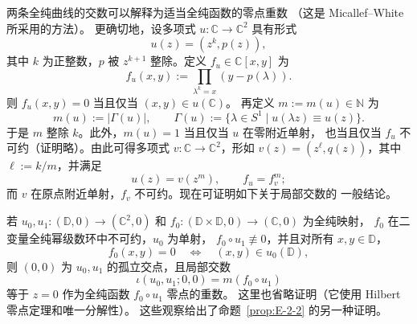 \begin{remark}\label{rem:E-2-6}
两条全纯曲线的交数可以解释为适当全纯函数的零点重数
（这是 Micallef--White~ 所采用的方法）。
更确切地，设多项式 $u:\mathbb C\to\mathbb C^2$ 具有形式
\[
  u(z)=(z^k,p(z)),
\]
其中 $k$ 为正整数，$p$ 被 $z^{k+1}$ 整除。定义
$f_u\in\mathbb C[x,y]$ 为
\[
  f_u(x,y):=\prod_{\lambda^k=x}(y-p(\lambda)).
\]
则 $f_u(x,y)=0$ 当且仅当 $(x,y)\in u(\mathbb C)$。
再定义 $m:=m(u)\in\mathbb N$ 为
\[
  m(u):=|\Gamma(u)|,\qquad
  \Gamma(u):=\{\lambda\in S^1\mid u(\lambda z)\equiv u(z)\}.
\]
于是 $m$ 整除 $k$。此外，$m(u)=1$ 当且仅当 $u$ 在零附近单射，
也当且仅当 $f_u$ 不可约（证明略）。由此可得多项式
$v:\mathbb C\to\mathbb C^2$，形如
$v(z)=(z^\ell,q(z))$，其中 $\ell:=k/m$，并满足
\[
  u(z)=v(z^m),\qquad f_u=f_v^m;
\]
而 $v$ 在原点附近单射，$f_v$ 不可约。现在可证明如下关于局部交数的
一般结论。

若 $u_0,u_1:(\mathbb D,0)\to(\mathbb C^2,0)$ 和
$f_0:(\mathbb D\times\mathbb D,0)\to(\mathbb C,0)$ 为全纯映射，
$f_0$ 在二变量全纯幂级数环中不可约，$u_0$ 为单射，
$f_0\circ u_1\not\equiv0$，并且对所有 $x,y\in\mathbb D$，
\[
  f_0(x,y)=0\quad\Longleftrightarrow\quad(x,y)\in u_0(\mathbb D),
\]
则 $(0,0)$ 为 $u_0,u_1$ 的孤立交点，且局部交数
\[
  \iota(u_0,u_1;0,0)=m(f_0\circ u_1)
\]
等于 $z=0$ 作为全纯函数 $f_0\circ u_1$ 零点的重数。
这里也省略证明（它使用 Hilbert 零点定理和唯一分解性）。
这些观察给出了命题~\ref{prop:E-2-2} 的另一种证明。
\end{remark}
